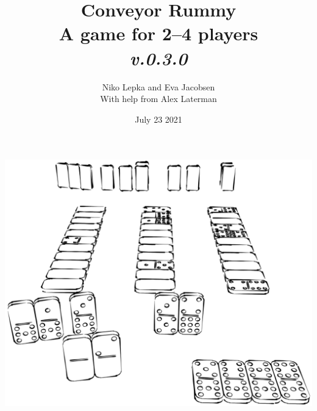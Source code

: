 \documentclass[a5paper]{article}
\title{%
    Conveyor Rummy\\%
    \large A game for 2--4 players\\%
    \normalsize \textit{v.0.3.0}
}
\author{Niko Lepka and Eva Jacobsen\\%
    \footnotesize With help from Alex Laterman}
\date{July 23 2021}
\begin{document}
\maketitle

\noindent\includegraphics[width = \linewidth]{graphics/dominoes-gameplay.png}







\end{document}
